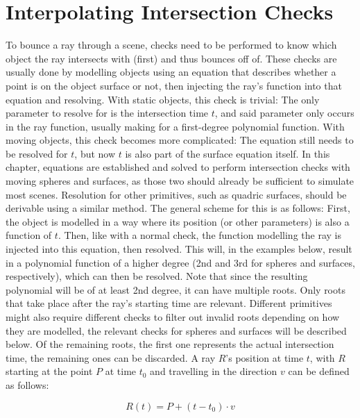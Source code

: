 \chapter{Interpolating Intersection Checks}

To bounce a ray through a scene, checks need to be performed to know which object the ray intersects with (first) and thus bounces off of.
These checks are usually done by modelling objects using an equation that describes whether a point is on the object surface or not,
then injecting the ray's function into that equation and resolving.
With static objects, this check is trivial:
The only parameter to resolve for is the intersection time \(t\), and said parameter only occurs in the ray function,
usually making for a first-degree polynomial function.
\newline
With moving objects, this check becomes more complicated: The equation still needs to be resolved for \(t\),
but now \(t\) is also part of the surface equation itself.
In this chapter, equations are established and solved to perform intersection checks with moving spheres and surfaces,
as those two should already be sufficient to simulate most scenes.
Resolution for other primitives, such as quadric surfaces, should be derivable using a similar method.
\newline
The general scheme for this is as follows:
First, the object is modelled in a way where its position (or other parameters) is also a function of \(t\).
Then, like with a normal check, the function modelling the ray is injected into this equation,
then resolved. This will, in the examples below, result in a polynomial function of a higher degree
(2nd and 3rd for spheres and surfaces, respectively), which can then be resolved.
Note that since the resulting polynomial will be of at least 2nd degree, it can have multiple roots.
Only roots that take place after the ray's starting time are relevant.
Different primitives might also require different checks to filter out invalid roots depending on how they are modelled,
the relevant checks for spheres and surfaces will be described below.
Of the remaining roots, the first one represents the actual intersection time, the remaining ones can be discarded.
\newline
A ray \(R\)'s position at time \(t\), with \(R\) starting at the point \(P\) at time \(t_0\) and travelling in the direction \(v\) can be defined as follows:

\begin{equation}\label{RayEq}
    R(t) = P + (t - t_0) \cdot v
\end{equation}


